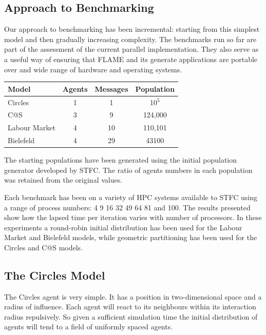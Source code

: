 \subsection{Approach to Benchmarking}
\label{sec:benchmarks}
Our approach to benchmarking has been incremental: starting from this simplest model and then gradually increasing complexity. The benchmarks run so far are part of the assessment of the current parallel implementation. They also serve as a useful way of ensuring that FLAME and its generate applications are portable over and wide range of hardware and operating systems. 

\begin{table}[ht]
 \centering
  \begin{tabular}{l|ccc}
  Model     & Agents & Messages & Population   \\\hline
  Circles     &   1    &   1      &  10$^5$    \\
  C@S       &   3    &   9      &  124,000 \\
  Labour Market &   4    &   10     &  110,101 \\ 
  Bielefeld     &   4    &   29     &  43100     \\\hline
  \end{tabular}
\end{table}

The starting populations have been generated using the initial population generator developed by STFC. The ratio of agents numbers in each population was retained from the original values.

Each benchmark has been on a variety of HPC systems available to STFC using a range of process numbers: 4 9 16 32 49 64 81 and 100. The results presented show how the lapsed time per iteration varies with number of processors. In these experiments a round-robin initial distribution has been used for the Labour Market and Bielefeld models, while geometric partitioning has been used for the Circles and C@S models.

\subsection{The Circles Model}
The Circles agent is very simple. It has a position in two-dimensional space and a radius of influence. Each agent will react to its neighbours within its interaction radius repulsively. So given a sufficient simulation time the initial distribution of agents will tend to a field of uniformly spaced agents.

